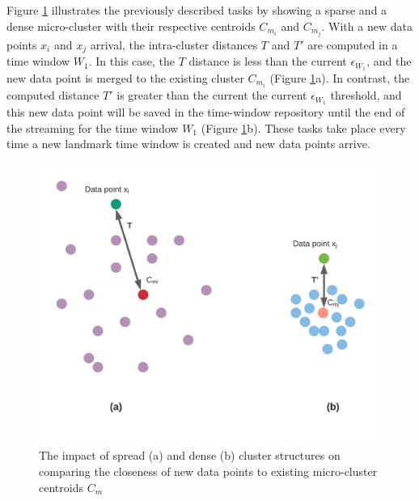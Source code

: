Figure \ref{thr} illustrates the previously described tasks by showing a sparse and a dense micro-cluster with their respective centroids $C_{m_i}$ and $C_{m_j}$. With a new data points $x_i$ and $x_j$ arrival, the intra-cluster distances $T$ and $T'$ are computed in a time window $W_1$. In this case, the $T$ distance is less than the current $\epsilon_{W_1}$, and the new data point is merged to the existing cluster $C_{m_i}$ (Figure \ref{thr}a). In contrast, the computed distance $T'$ is greater than the current the current $\epsilon_{W_1}$ threshold, and this new data point will be saved in the time-window repository until the end of the streaming for the time window $W_1$ (Figure \ref{thr}b). These tasks take place every time a new landmark time window is created and new data points arrive.
     
    \begin{figure}[!ht]
    \centering
    \includegraphics[width = 11 cm]{image/Chapters/Chapter4/threshold.png}
    \caption{The impact of spread (a) and dense (b) cluster structures on comparing the closeness of new data points to existing micro-cluster centroids $C_m$ } 
    \label{thr}
    \end{figure}

